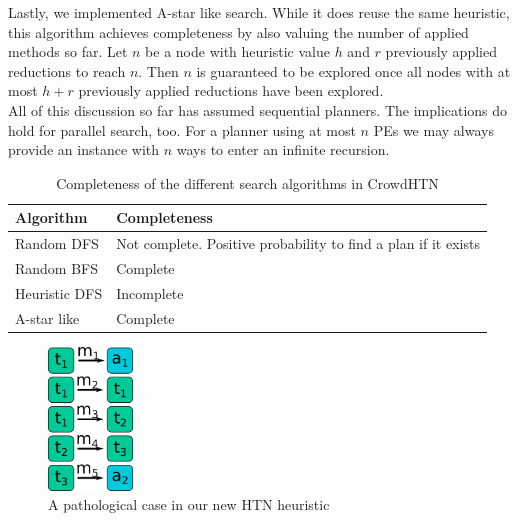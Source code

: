 Lastly, we implemented A-star like search. While it does reuse the same heuristic, this algorithm achieves completeness by also valuing the number of applied methods so far. Let $n$ be a node with heuristic value $h$ and $r$ previously applied reductions to reach $n$. Then $n$ is guaranteed to be explored once all nodes with at most $h + r$ previously applied reductions have been explored. \\
All of this discussion so far has assumed sequential planners. The implications do hold for parallel search, too. For a planner using at most $n$ PEs we may always provide an instance with $n$ ways to enter an infinite recursion.
\begin{table}
	\caption{Completeness of the different search algorithms in CrowdHTN}
	\label{table: search completeness}
	\centering
	\begin{tabular}{| l | l |}
		\hline
		Algorithm & Completeness \\
		\hline
		Random DFS & Not complete. Positive probability to find a plan if it exists \\
		Random BFS & Complete \\
		Heuristic DFS & Incomplete \\
		A-star like & Complete \\
		\hline
	\end{tabular}
\end{table}
\begin{figure}
	\caption{A pathological case in our new HTN heuristic}
	\label{figure: improv heuristic pathological}
	\centering
	\includegraphics[width=0.2\textwidth]{images/final/heuristic_pathological}
\end{figure}

